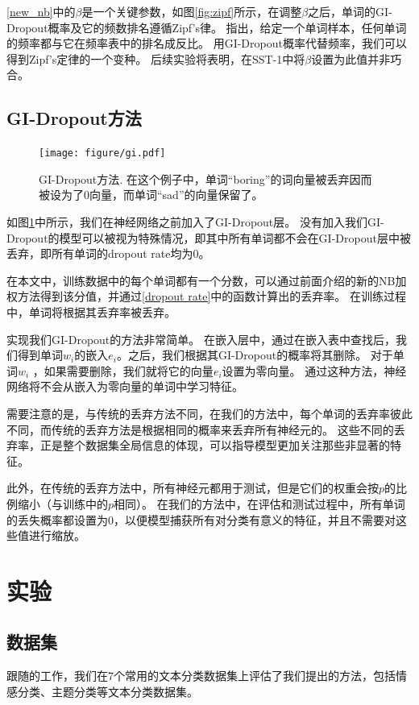 \ref{new_nb}中的$\beta$是一个关键参数，如图\ref{fig:zipf}所示，在调整$\beta$之后，单词的GI-Dropout概率及它的频数排名遵循Zipf's律。
指出，给定一个单词样本，任何单词的频率都与它在频率表中的排名成反比。
用GI-Dropout概率代替频率，我们可以得到Zipf's定律的一个变种。
后续实验将表明，在SST-1中将$\beta$设置为此值并非巧合。

\subsection{GI-Dropout方法}
\begin{figure}[!t]
\centering
  \texttt{[image: figure/gi.pdf]}
  \caption{GI-Dropout方法. 在这个例子中，单词``boring''的词向量被丢弃因而被设为了0向量，而单词``sad''的向量保留了。}
  \label{fig: model}
\end{figure}

如图\ref{fig: model}中所示，我们在神经网络之前加入了GI-Dropout层。
没有加入我们GI-Dropout的模型可以被视为特殊情况，即其中所有单词都不会在GI-Dropout层中被丢弃，即所有单词的dropout rate均为0。

在本文中，训练数据中的每个单词都有一个分数，可以通过前面介绍的新的NB加权方法得到该分值，并通过\ref{dropout rate}中的函数计算出的丢弃率。
在训练过程中，单词将根据其丢弃率被丢弃。

实现我们GI-Dropout的方法非常简单。
在嵌入层中，通过在嵌入表中查找后，我们得到单词$w_{i}$的嵌入$e_{i}$。之后，我们根据其GI-Dropout的概率将其删除。
对于单词$w_{i}$ ，如果需要删除，我们就将它的向量$e_{i}$设置为零向量。
通过这种方法，神经网络将不会从嵌入为零向量的单词中学习特征。

需要注意的是，与传统的丢弃方法不同，在我们的方法中，每个单词的丢弃率彼此不同，而传统的丢弃方法是根据相同的概率来丢弃所有神经元的。
这些不同的丢弃率，正是整个数据集全局信息的体现，可以指导模型更加关注那些非显著的特征。
 
此外，在传统的丢弃方法中，所有神经元都用于测试，但是它们的权重会按$p$的比例缩小（与训练中的$p$相同）。
在我们的方法中，在评估和测试过程中，所有单词的丢失概率都设置为0，以便模型捕获所有对分类有意义的特征，并且不需要对这些值进行缩放。


\section{实验}
\subsection{数据集}
跟随\citep{kim2014convolutional}的工作，我们在7个常用的文本分类数据集上评估了我们提出的方法，包括情感分类、主题分类等文本分类数据集。

